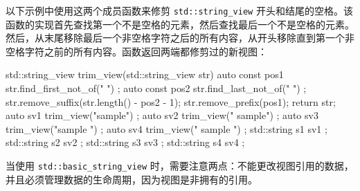 以下示例中使用这两个成员函数来修剪 \verb|std::string_view| 开头和结尾的空格。该函数的实现首先查找第一个不是空格的元素，然后查找最后一个不是空格的元素。然后，从末尾移除最后一个非空格字符之后的所有内容，从开头移除直到第一个非空格字符之前的所有内容。函数返回两端都修剪过的新视图：

\begin{cpp}
std::string_view trim_view(std::string_view str)
{
    auto const pos1{ str.find_first_not_of(" ") };
    auto const pos2{ str.find_last_not_of(" ") };
    str.remove_suffix(str.length() - pos2 - 1);
    str.remove_prefix(pos1);
    return str;
}
auto sv1{ trim_view("sample") };
auto sv2{ trim_view("  sample") };
auto sv3{ trim_view("sample  ") };
auto sv4{ trim_view("  sample  ") };
std::string s1{ sv1 };
std::string s2{ sv2 };
std::string s3{ sv3 };
std::string s4{ sv4 };
\end{cpp}

当使用 \verb|std::basic_string_view| 时，需要注意两点：不能更改视图引用的数据，并且必须管理数据的生命周期，因为视图是非拥有的引用。

